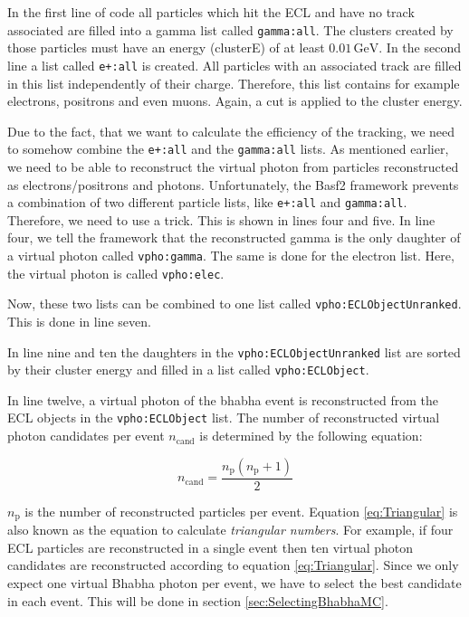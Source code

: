 \documentclass[a4paper,11pt,twosided,final,german,openbib,pdftex,listof=totoc,bibliography=totoc]{scrbook}
\begin{document}
In the first line of code all particles which hit the ECL and have no track associated are filled into a gamma list called \texttt{gamma:all}. The clusters created by those particles must have an energy (clusterE) of at least $0.01\,\textrm{GeV}$. In the second line a list called \texttt{e+:all} is created. All particles with an associated track are filled in this list independently of their charge. Therefore, this list contains for example electrons, positrons and even muons. Again, a cut is applied to the cluster energy.


Due to the fact, that we want to calculate the efficiency of the tracking, we need to somehow combine the \texttt{e+:all} and the \texttt{gamma:all} lists. As mentioned earlier, we need to be able to reconstruct the virtual photon from particles reconstructed as electrons/positrons and photons.
Unfortunately, the Basf2 framework prevents a combination of two different particle lists, like \texttt{e+:all} and \texttt{gamma:all}. Therefore, we need to use a trick. This is shown in lines four and five. In line four, we tell the framework that the reconstructed gamma is the only daughter of a virtual photon called \texttt{vpho:gamma}. The same is done for the electron list. Here, the virtual photon is called \texttt{vpho:elec}. 

Now, these two lists can be combined to one list called \texttt{vpho:ECLObjectUnranked}. This is done in line seven.

In line nine and ten the daughters in the \texttt{vpho:ECLObjectUnranked} list are sorted by their cluster energy and filled in a list called \texttt{vpho:ECLObject}.

In line twelve, a virtual photon of the bhabha event is reconstructed from the ECL objects in the \texttt{vpho:ECLObject} list. The number of reconstructed virtual photon candidates per event $n_{\textrm{cand}}$ is determined by the following equation\cite{triangular}:

\begin{equation}
n_{\textrm{cand}} = \frac{n_{\textrm{p}}(n_{\textrm{p}} +1)}{2}
\label{eq:Triangular}
\end{equation}

$n_{\textrm{p}}$ is the number of reconstructed particles per event. Equation \ref{eq:Triangular} is also known as the equation to calculate \textit{triangular numbers}. For example, if four ECL particles are reconstructed in a single event then ten virtual photon candidates are reconstructed according to equation \ref{eq:Triangular}. Since we only expect one virtual Bhabha photon per event, we have to select the best candidate in each event. This will be done in section \ref{sec:SelectingBhabhaMC}.
\end{document}
